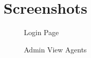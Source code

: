 \documentclass[oneside,a4paper,12pt]{report}
\begin{document}
{\section{Screenshots}

\begin{center}
	\begin{figure}[!htbp]
		\centering
		\caption{Login Page}
		\label{fig:Login}
	\end{figure}
\end{center}

\begin{center}
	\begin{figure}[!htbp]
		\centering
		\caption{Admin View Agents}
		\label{fig:Admin View Agents}
	\end{figure}
\end{center}
\newpage

}
\end{document}
